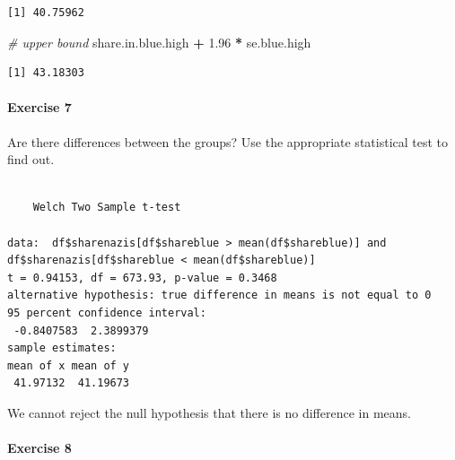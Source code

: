 \documentclass[]{article}
\newenvironment{Shaded}{\begin{snugshade}}{\end{snugshade}}
\newcommand{\KeywordTok}[1]{\textcolor[rgb]{0.13,0.29,0.53}{\textbf{#1}}}
\newcommand{\FloatTok}[1]{\textcolor[rgb]{0.00,0.00,0.81}{#1}}
\newcommand{\StringTok}[1]{\textcolor[rgb]{0.31,0.60,0.02}{#1}}
\newcommand{\CommentTok}[1]{\textcolor[rgb]{0.56,0.35,0.01}{\textit{#1}}}
\newcommand{\OperatorTok}[1]{\textcolor[rgb]{0.81,0.36,0.00}{\textbf{#1}}}
\newcommand{\NormalTok}[1]{#1}
\let\oldparagraph\paragraph
\renewcommand{\paragraph}[1]{\oldparagraph{#1}\mbox{}}
\theoremstyle{definition}
\theoremstyle{definition}
\theoremstyle{definition}
\theoremstyle{remark}
\begin{document}
\begin{verbatim}
[1] 40.75962
\end{verbatim}

\begin{Shaded}
\begin{Highlighting}[]
\CommentTok{# upper bound}
\NormalTok{share.in.blue.high }\OperatorTok{+}\StringTok{ }\FloatTok{1.96} \OperatorTok{*}\StringTok{ }\NormalTok{se.blue.high}
\end{Highlighting}
\end{Shaded}

\begin{verbatim}
[1] 43.18303
\end{verbatim}

\paragraph{Exercise 7}\label{exercise-7-3}

Are there differences between the groups? Use the appropriate
statistical test to find out.

\begin{Shaded}
\end{Shaded}

\begin{verbatim}

    Welch Two Sample t-test

data:  df$sharenazis[df$shareblue > mean(df$shareblue)] and df$sharenazis[df$shareblue < mean(df$shareblue)]
t = 0.94153, df = 673.93, p-value = 0.3468
alternative hypothesis: true difference in means is not equal to 0
95 percent confidence interval:
 -0.8407583  2.3899379
sample estimates:
mean of x mean of y 
 41.97132  41.19673 
\end{verbatim}

We cannot reject the null hypothesis that there is no difference in
means.

\paragraph{Exercise 8}\label{exercise-8-4}
\end{document}

